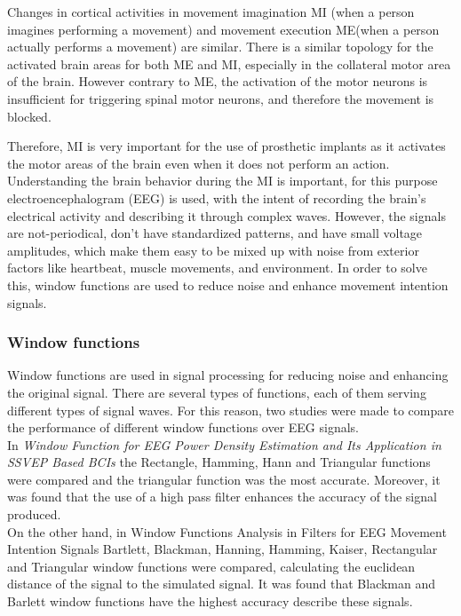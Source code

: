 Changes in cortical activities in movement imagination MI (when a person imagines performing a movement) and movement execution ME(when a person actually performs a movement) are similar. There is a similar topology for the activated brain areas for both ME and MI, especially in the collateral motor area of the brain. However contrary to ME, the activation of the motor neurons is insufficient for triggering spinal motor neurons, and therefore the movement is blocked.

Therefore, MI is very important for the use of prosthetic implants as it activates the motor areas of the brain even when it does not perform an action. Understanding the brain behavior during the MI is important, for this purpose electroencephalogram (EEG) is used, with the intent of recording the brain’s electrical activity and describing it through complex waves.  However, the signals are not-periodical, don't have standardized patterns, and have small voltage amplitudes, which make them easy to be mixed up with noise from exterior factors like heartbeat, muscle movements, and environment. In order to solve this, window functions are used to reduce noise and enhance movement intention signals.

\subsubsection{Window functions}

Window functions are used in signal processing for reducing noise and enhancing the original signal. There are several types of functions, each of them serving different types of signal waves.  For this reason, two studies were made to compare the performance of different window functions over EEG signals.\\

In \textit{Window Function for EEG Power Density Estimation and Its Application in SSVEP Based BCIs} the Rectangle, Hamming, Hann and Triangular functions were compared and the triangular function was the most accurate. Moreover, it was found that the use of a high pass filter enhances the accuracy of the signal produced.\\

On the other hand, in Window Functions Analysis in Filters for EEG Movement Intention Signals Bartlett, Blackman, Hanning, Hamming, Kaiser, Rectangular and Triangular window functions were compared, calculating the euclidean distance of the signal to the simulated signal. It was found that Blackman and Barlett window functions have the highest accuracy describe these signals.

